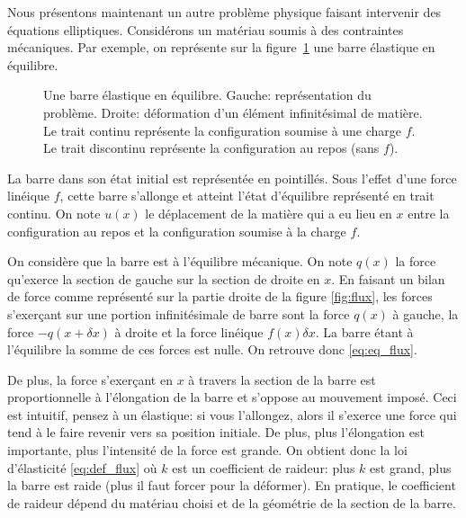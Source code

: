 \documentclass[12pt,a4paper,twoside]{article}
\begin{document}
Nous pr\'esentons maintenant
un autre probl\`eme physique faisant intervenir des \'equations elliptiques.
Consid\'erons un mat\'eriau 
soumis \`a des contraintes m\'ecaniques.
Par exemple, on repr\'esente sur la figure~\ref{fig:barre} une barre \'elastique
en \'equilibre.


\begin{figure}
\begin{tikzpicture}[scale = 1.5]
  
\end{tikzpicture}
\begin{tikzpicture}[scale = 2]
  
\end{tikzpicture}
\caption{Une barre \'elastique en \'equilibre. Gauche: repr\'esentation du probl\`eme.
  Droite: d\'eformation d'un \'el\'ement infinit\'esimal de mati\`ere.
  Le trait continu repr\'esente la configuration soumise \`a une charge $f$.
  Le trait discontinu repr\'esente la configuration au repos (sans $f$).}
\label{fig:barre}
\end{figure}


La barre dans son \'etat initial est repr\'esent\'ee en pointill\'es.
Sous l'effet d'une force lin\'eique $f$, cette barre s'allonge
et atteint l'\'etat d'\'equilibre repr\'esent\'e en trait continu.
On note $u(x)$ le d\'eplacement de la mati\`ere qui a eu lieu en $x$ entre
la configuration au repos et la configuration soumise \`a la charge $f$.


On consid\`ere que la barre est \`a l'\'equilibre m\'ecanique.
On note $q(x)$ la force qu'exerce la section de gauche sur la section de droite
en $x$. En faisant un bilan de force comme repr\'esent\'e 
sur la partie droite de la figure \ref{fig:flux},
les forces s'exer\c{c}ant sur une portion infinit\'esimale de barre sont
la force $q(x)$ \`a gauche, la force $-q(x+\delta x)$ \`a droite
et la force lin\'eique $f(x) \delta x$. La barre \'etant \`a l'\'equilibre la somme de ces forces
est nulle. On retrouve donc \eqref{eq:eq_flux}.


De plus, la force s'exer\c{c}ant en $x$ \`a travers la section de la barre est 
proportionnelle \`a l'\'elongation de la barre et s'oppose au mouvement impos\'e.
Ceci est intuitif, pensez \`a un \'elastique: si vous l'allongez, alors il s'exerce une force
qui tend \`a le faire revenir vers sa position initiale. De plus, plus l'\'elongation
est importante, plus l'intensit\'e de la force est grande.
On obtient donc la loi d'\'elasticit\'e \eqref{eq:def_flux}
o\`u $k$ est un coefficient de raideur:
plus $k$ est grand, plus la barre est raide (plus il faut forcer pour la d\'eformer).
En pratique, le coefficient de raideur d\'epend du mat\'eriau choisi et
de la g\'eom\'etrie de la section de la barre.
\end{document}
